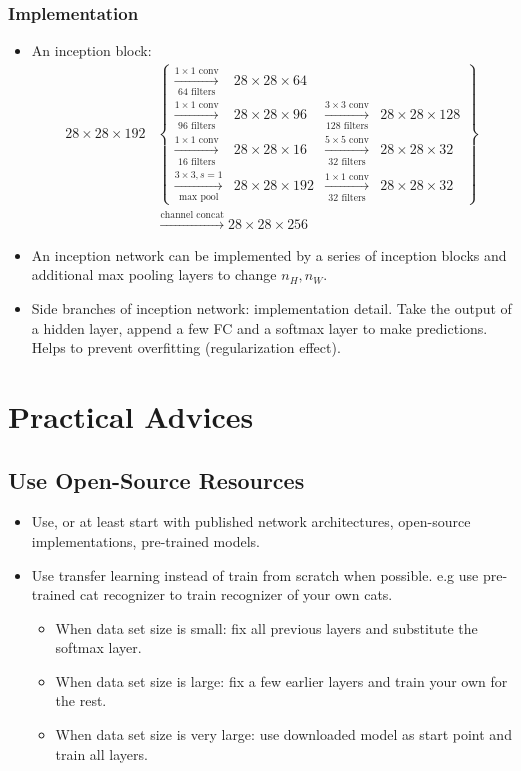 \subsubsection{Implementation}
\begin{itemize}
  \item An inception block:
\begin{align*}
  28\times 28\times 192&\left\{
    \begin{aligned}
      \xrightarrow[64\text{ filters}]{1\times 1\text{ conv}}&28\times 28\times 64\\
      \xrightarrow[96\text{ filters}]{1\times 1\text{ conv}}&28\times 28\times 96&\xrightarrow[128\text{ filters}]{3\times 3\text{ conv}}&28\times 28\times 128\\
      \xrightarrow[16\text{ filters}]{1\times 1\text{ conv}}&28\times 28\times 16&\xrightarrow[32\text{ filters}]{5\times 5\text{ conv}}&28\times 28\times 32\\
      \xrightarrow[\text{max pool}]{3\times 3, s=1}&28\times 28\times 192&\xrightarrow[32\text{ filters}]{1\times 1\text{ conv}}&28\times 28\times 32
    \end{aligned}
  \right\}\\&\xrightarrow{\text{channel concat}}
  28\times 28\times 256
\end{align*}
  \item An inception network can be implemented by a series of inception blocks and additional max pooling layers to change $n_H,n_W$.
  \item Side branches of inception network: implementation detail. Take the output of a hidden layer, append a few FC and a softmax layer to make predictions. Helps to prevent overfitting (regularization effect).
\end{itemize}
\section{Practical Advices}
\subsection{Use Open-Source Resources}
\begin{itemize}
  \item Use, or at least start with published network architectures, open-source implementations, pre-trained models.
  \item Use transfer learning instead of train from scratch when possible. e.g use pre-trained cat recognizer to train recognizer of your own cats.
    \begin{itemize}
      \item When data set size is small: fix all previous layers and substitute the softmax layer.
      \item When data set size is large: fix a few earlier layers and train your own for the rest.
      \item When data set size is very large: use downloaded model as start point and train all layers.
    \end{itemize}
\end{itemize}
